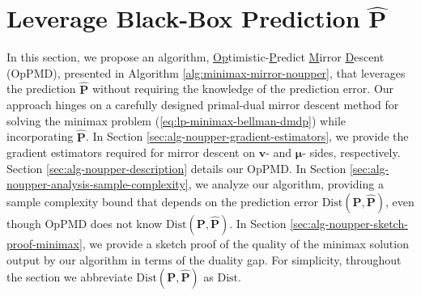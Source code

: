 \documentclass[12pt]{article}
\begin{document}


\section{Leverage Black-Box Prediction $\hat{\boldsymbol{\text{P}}}$}

\label{sec:algorithm-noupper}

In this section, we propose an algorithm, \underline{Op}timistic-\underline{P}redict \underline{M}irror \underline{D}escent (OpPMD), presented in Algorithm \ref{alg:minimax-mirror-noupper}, that leverages the prediction $\hat{\boldsymbol{\text{P}}}$ without requiring the knowledge of the prediction error. Our approach hinges on a carefully designed primal-dual mirror descent method for solving the minimax problem (\ref{eq:lp-minimax-bellman-dmdp}) while incorporating $\hat{\boldsymbol{\text{P}}}$. 
In Section \ref{sec:alg-noupper-gradient-estimators}, we provide the gradient estimators required for mirror descent on $\boldsymbol{v}$- and $\boldsymbol{\mu}$- sides, respectively. Section \ref{sec:alg-noupper-description} details our OpPMD. In Section \ref{sec:alg-noupper-analysis-sample-complexity}, we analyze our algorithm, providing a sample complexity bound that depends on the prediction error $\text{Dist}(\boldsymbol{\text{P}},\hat{\boldsymbol{\text{P}}})$, even though OpPMD does not know $\text{Dist}(\boldsymbol{\text{P}},\hat{\boldsymbol{\text{P}}})$. 
In Section \ref{sec:alg-noupper-sketch-proof-minimax}, we provide a sketch proof of the quality of the minimax solution output by our algorithm in terms of the duality gap. For simplicity, throughout the section we abbreviate $\text{Dist}(\boldsymbol{\text{P}},\hat{\boldsymbol{\text{P}}})$ as $\text{Dist}$.
\end{document}
